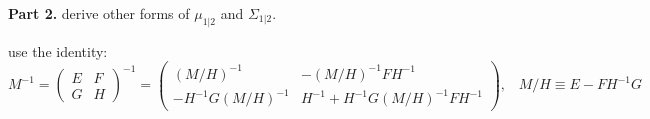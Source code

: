 \documentclass{article}
\begin{document}
\newpage
\noindent
\textbf{Part 2.} derive other forms of $\mu_{1 | 2}$ and $\Sigma_{1 | 2}$.

use the identity:
\begin{equation*}
M^{-1} = \begin{pmatrix} E & F \\ G & H \end{pmatrix}^{-1} = \begin{pmatrix} (M/H)^{-1} & - (M/H)^{-1} F H^{-1} \\ -H^{-1} G (M/H)^{-1} & H^{-1} + H^{-1} G (M/H)^{-1} F H^{-1} \end{pmatrix}, \hspace{10pt} M/H \equiv E - F H^{-1} G
\end{equation*}
\end{document}
